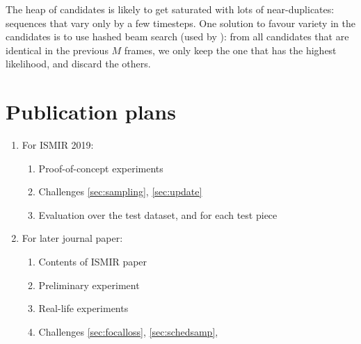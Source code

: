 \documentclass{article}
\begin{document}
The heap of candidates is likely to get saturated with lots of near-duplicates: sequences that vary only by a few timesteps.
One solution to favour variety in the candidates is to use hashed beam search (used by \cite{Korzeniowski2018}):
from all candidates that are identical in the previous $M$ frames, we only keep the one that has the highest likelihood, and discard the others.


\section{Publication plans}

\begin{enumerate}
\item For ISMIR 2019: 
	\begin{enumerate}
	\item Proof-of-concept experiments
	\item Challenges \ref{sec:sampling}, \ref{sec:update}
	\item Evaluation over the test dataset, and for each test piece
	\end{enumerate}

\item For later journal paper:
	\begin{enumerate}
	\item Contents of ISMIR paper
	\item Preliminary experiment
	\item Real-life experiments
	\item Challenges \ref{sec:focalloss}, \ref{sec:schedsamp},
	\end{enumerate}
\end{enumerate}



\end{document}
